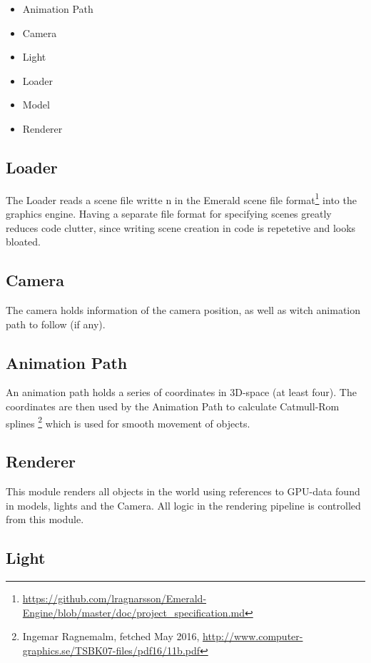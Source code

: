 \documentclass{article}
\begin{document}
\begin{itemize}
    \item Animation Path
    \item Camera
    \item Light
    \item Loader
    \item Model
    \item Renderer
\end{itemize}

\subsection{Loader}

The Loader reads a scene file writte n in the Emerald scene file format\footnote{\url{https://github.com/lragnarsson/Emerald-Engine/blob/master/doc/project_specification.md}} into the graphics engine. Having a separate file format for specifying scenes greatly reduces code clutter, since writing scene creation in code is repetetive and looks bloated.

\subsection{Camera}

The camera holds information of the camera position, as well as witch animation path to follow (if any).

\subsection{Animation Path}

An animation path holds a series of coordinates in 3D-space (at least four). The coordinates are then used by the Animation Path to calculate Catmull-Rom splines \footnote{Ingemar Ragnemalm, fetched May 2016, \url{http://www.computer-graphics.se/TSBK07-files/pdf16/11b.pdf}} which is used for smooth movement of objects.

\subsection{Renderer}

This module renders all objects in the world using references to GPU-data found in models, lights and the Camera. All logic in the rendering pipeline is controlled from this module.

\subsection{Light}
\end{document}
